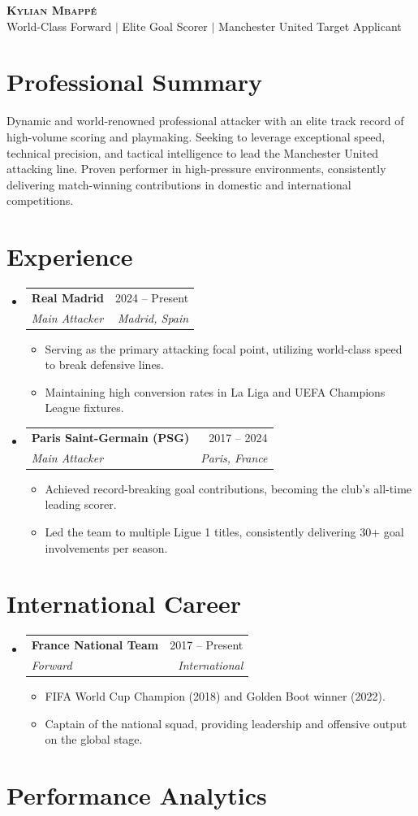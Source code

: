 \documentclass[letterpaper,11pt]{article}
\makeatletter
\newcommand{\resumeItem}[1]{\item\small{{#1 \vspace{-2pt}}}}
\newcommand{\resumeSubheading}[4]{\vspace{-2pt}\item\begin{tabular*}{0.97\textwidth}[t]{l@{\extracolsep{\fill}}r}\textbf{#1} & #2 \\ \textit{\small#3} & \textit{\small #4} \\ \end{tabular*}\vspace{-7pt}}
\newcommand{\resumeSubHeadingListStart}{\begin{itemize}[leftmargin=0.15in, label={}]}
\newcommand{\resumeSubHeadingListEnd}{\end{itemize}}
\newcommand{\resumeItemListStart}{\begin{itemize}}
\newcommand{\resumeItemListEnd}{\end{itemize}\vspace{-5pt}}
\makeatother
\begin{document}
\begin{center}
\textbf{\Huge \scshape Kylian Mbappé} \\ \vspace{1pt}
\small World-Class Forward $|$ Elite Goal Scorer $|$ Manchester United Target Applicant
\end{center}

\section{Professional Summary}
Dynamic and world-renowned professional attacker with an elite track record of high-volume scoring and playmaking. Seeking to leverage exceptional speed, technical precision, and tactical intelligence to lead the Manchester United attacking line. Proven performer in high-pressure environments, consistently delivering match-winning contributions in domestic and international competitions.

\section{Experience}
\resumeSubHeadingListStart
\resumeSubheading{Real Madrid}{2024 -- Present}{Main Attacker}{Madrid, Spain}
\resumeItemListStart
\resumeItem{Serving as the primary attacking focal point, utilizing world-class speed to break defensive lines.}
\resumeItem{Maintaining high conversion rates in La Liga and UEFA Champions League fixtures.}
\resumeItemListEnd

\resumeSubheading{Paris Saint-Germain (PSG)}{2017 -- 2024}{Main Attacker}{Paris, France}
\resumeItemListStart
\resumeItem{Achieved record-breaking goal contributions, becoming the club's all-time leading scorer.}
\resumeItem{Led the team to multiple Ligue 1 titles, consistently delivering 30+ goal involvements per season.}
\resumeItemListEnd
\resumeSubHeadingListEnd

\section{International Career}
\resumeSubHeadingListStart
\resumeSubheading{France National Team}{2017 -- Present}{Forward}{International}
\resumeItemListStart
\resumeItem{FIFA World Cup Champion (2018) and Golden Boot winner (2022).}
\resumeItem{Captain of the national squad, providing leadership and offensive output on the global stage.}
\resumeItemListEnd
\resumeSubHeadingListEnd

\section{Performance Analytics}
\begin{center}
\end{center}
\end{document}
